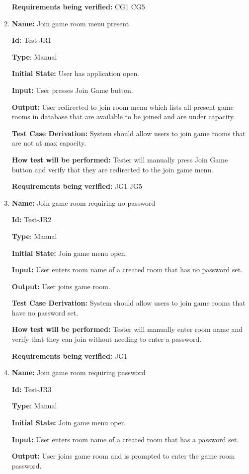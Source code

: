 \documentclass[12pt, titlepage]{article}
\begin{document}
\begin{enumerate}
\textbf{Requirements being verified: }CG1 CG5

\item{\textbf{Name:} Join game room menu present }

\textbf{Id:} Test-JR1

\textbf{Type}: Manual

\textbf{Initial State:} User has application open.

\textbf{Input:} User presses Join Game button.

\textbf{Output:} User redirected to join room menu which lists all present game rooms in database that are available to be joined and are under capacity.

\textbf{Test Case Derivation:} System should allow users to join game rooms that are not at max capacity.

\textbf{How test will be performed:} Tester will manually press Join Game button and verify that they are redirected to the join game menu.

\textbf{Requirements being verified: }JG1 JG5

\item{\textbf{Name:} Join game room requiring no password}

\textbf{Id:} Test-JR2

\textbf{Type}: Manual

\textbf{Initial State:} Join game menu open.

\textbf{Input:} User enters room name of a created room that has no password set.

\textbf{Output:} User joins game room.

\textbf{Test Case Derivation:} System should allow users to join game rooms that have no password set.

\textbf{How test will be performed:} Tester will manually enter room name and verify that they can join without needing to enter a password.

\textbf{Requirements being verified: }JG1

\item{\textbf{Name:} Join game room requiring password}

\textbf{Id:} Test-JR3

\textbf{Type}: Manual

\textbf{Initial State:} Join game menu open.

\textbf{Input:} User enters room name of a created room that has a password set.

\textbf{Output:} User joins game room and is prompted to enter the game room password.


\end{enumerate}
\end{document}
